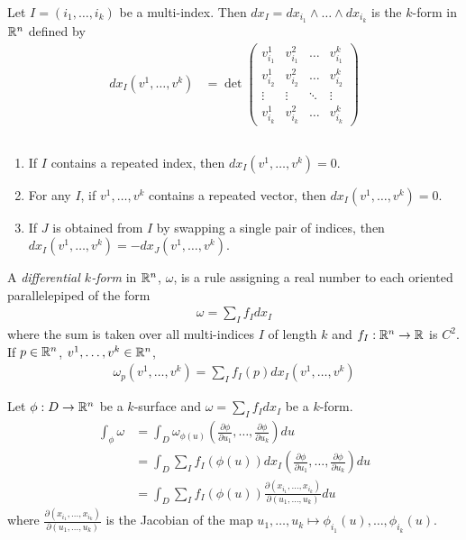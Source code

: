 \documentclass[11pt]{article}
\begin{document}
\begin{definition} Let $I = (i_1, \dots, i_k)$ be a multi-index. Then $dx_I = dx_{i_1} \wedge \dots \wedge dx_{i_k}$ is the $k$-form in $\mathbb{R}^n$ defined by \begin{align*} dx_I (v^1 , \dots, v^k) & = \det \begin{pmatrix} v_{i_1}^1 & v_{i_1}^2 & \hdots & v_{i_1}^k \\ v_{i_2}^1 & v_{i_2}^2 & \hdots & v_{i_2}^k \\ \vdots & \vdots & \ddots & \vdots \\ v_{i_k}^1 & v_{i_k}^2 & \hdots & v_{i_k}^k \end{pmatrix} \end{align*}
\end{definition}

\begin{remark} $\text{}$
  \begin{enumerate}
  \item If $I$ contains a repeated index, then $dx_I (v^1, \dots, v^k) = 0$.
  \item For any $I$, if $v^1, \dots, v^k$ contains a repeated vector, then $dx_I (v^1, \dots, v^k) = 0$. 
  \item If $J$ is obtained from $I$ by swapping a single pair of indices, then $dx_I (v^1, \dots, v^k) = - dx_J (v^1, \dots, v^k)$.
  \end{enumerate}
\end{remark}

\begin{definition} A \emph{differential $k$-form} in $\mathbb{R}^n$, $\omega$, is a rule assigning a real number to each oriented parallelepiped of the form \begin{align*} \omega = \sum_I f_I dx_I \end{align*} where the sum is taken over all multi-indices $I$ of length $k$ and $f_I: \mathbb{R}^n \to \mathbb{R}$ is $C^2$. If $p \in \mathbb{R}^n$, $v^1, \dots, v^k \in \mathbb{R}^n$, \begin{align*} \omega_p (v^1, \dots, v^k) = \sum_I f_I (p) dx_I (v^1, \dots, v^k) \end{align*}
\end{definition}

\begin{definition} Let $\phi: D \to \mathbb{R}^n$ be a $k$-surface and $\omega = \sum_I f_I dx_I$ be a $k$-form. \begin{align*} \int_{\phi} \omega & = \int_D \omega_{\phi(u)} \left( \frac{\partial \phi}{\partial u_1} , \dots, \frac{\partial \phi}{\partial u_k} \right) du \\ & = \int_D \sum_I f_I(\phi(u)) dx_I \left( \frac{\partial \phi}{\partial u_1} , \dots, \frac{\partial \phi}{\partial u_k} \right) du \\ & = \int_D \sum_I f_I (\phi(u)) \frac{\partial(x_{i_1}, \dots, x_{i_k})}{\partial (u_1, \dots, u_k)} du \end{align*} where $\frac{\partial(x_{i_1}, \dots, x_{i_k})}{\partial (u_1, \dots, u_k)}$ is the Jacobian of the map $u_1, \dots, u_k \mapsto \phi_{i_1}(u), \dots, \phi_{i_k}(u)$.
\end{definition}

\end{document}
